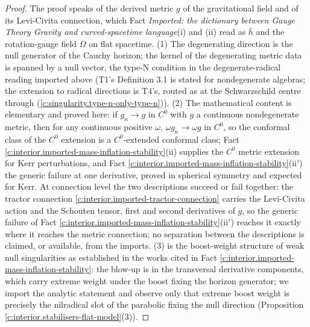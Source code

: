 \documentclass[11pt]{article}
\theoremstyle{definition}
\theoremstyle{plain}
\providecommand{\hb}{}\renewcommand{\hb}{\bar{h}}
\begin{document}
\begin{proof}
The proof speaks of the derived metric $g$ of the gravitational field and of its Levi-Civita connection, which Fact \emph{Imported: the dictionary between Gauge Theory Gravity and curved-spacetime language}(i) and (ii) read as $\hb$ and the rotation-gauge field $\Omega$ on flat spacetime. (1) The degenerating direction is the null generator of the Cauchy horizon; the kernel of the degenerating metric data is spanned by a null vector, the type-N condition in the degenerate-radical reading imported above (T1's Definition 3.1 is stated for nondegenerate algebras; the extension to radical directions is T4's, routed as at the Schwarzschild centre through \cite[Prop.~3.1]{ButlerT5} (\ref{c:singularity.type-n-only-type-n})). (2) The mathematical content is elementary and proved here: if $g_n \to g$ in $C^0$ with $g$ a continuous nondegenerate metric, then for any continuous positive $\omega$, $\omega g_n \to \omega g$ in $C^0$, so the conformal class of the $C^0$ extension is a $C^0$-extended conformal class; Fact \ref{c:interior.imported-mass-inflation-stability}(ii) supplies the $C^0$ metric extension for Kerr perturbations, and Fact \ref{c:interior.imported-mass-inflation-stability}(ii$'$) the generic failure at one derivative, proved in spherical symmetry and expected for Kerr. At connection level the two descriptions succeed or fail together: the tractor connection \ref{c:interior.imported-tractor-connection} carries the Levi-Civita action and the Schouten tensor, first and second derivatives of $g$, so the generic failure of Fact \ref{c:interior.imported-mass-inflation-stability}(ii$'$) reaches it exactly where it reaches the metric connection; no separation between the descriptions is claimed, or available, from the imports. (3) is the boost-weight structure of weak null singularities as established in the works cited in Fact \ref{c:interior.imported-mass-inflation-stability}: the blow-up is in the transversal derivative components, which carry extreme weight under the boost fixing the horizon generator; we import the analytic statement and observe only that extreme boost weight is precisely the nilradical slot of the parabolic fixing the null direction (Proposition \ref{c:interior.stabilisers-flat-model}(3)).

\end{proof}
\end{document}
